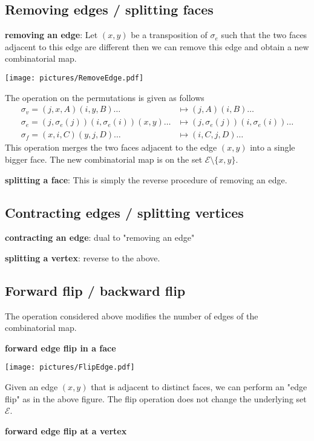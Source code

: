 \documentclass{article}
\def\cE{\mathcal{E}}
\begin{document}
\subsection{Removing edges / splitting faces}
\textbf{removing an edge}:
Let $(x,y)$ be a transposition of $\sigma_e$ such that the two faces adjacent to this
edge are different then we can remove this edge and obtain a new combinatorial map.
\begin{center}\texttt{[image: pictures/RemoveEdge.pdf]}\end{center}
The operation on the permutations is given as follows
\begin{align*}
\sigma_v = (j,x,A) (i,y,B) \ldots & \mapsto (j,A) (i,B) \ldots \\
\sigma_e = (j, \sigma_e(j)) (i, \sigma_e(i)) (x,y) \ldots & \mapsto (j, \sigma_e(j)) (i, \sigma_e(i)) \ldots \\
\sigma_f = (x,i,C) (y,j,D) \ldots & \mapsto (i,C,j,D) \ldots 
\end{align*} 
This operation merges the two faces adjacent to the edge $(x,y)$ into a single bigger face.
The new combinatorial map is on the set $\cE \setminus \{x,y\}$.

\textbf{splitting a face}:
This is simply the reverse procedure of removing an edge.

\subsection{Contracting edges / splitting vertices}
\textbf{contracting an edge}:
dual to "removing an edge"

\textbf{splitting a vertex}:
reverse to the above.

\subsection{Forward flip / backward flip}
The operation considered above modifies the number of edges of the combinatorial map.

\textbf{forward edge flip in a face}
\begin{center}\texttt{[image: pictures/FlipEdge.pdf]}\end{center}
Given an edge $(x,y)$ that is adjacent to distinct faces, we can perform an
"edge flip" as in the above figure.
The flip operation does not change the underlying set $\cE$.

\textbf{forward edge flip at a vertex}

\bigskip
\end{document}
